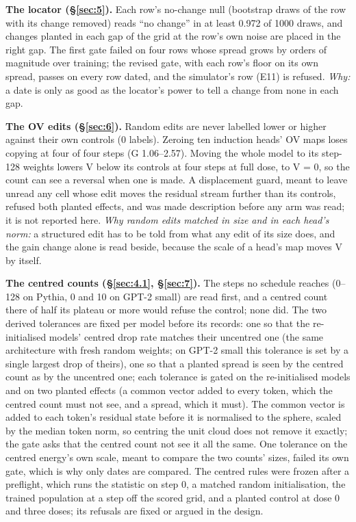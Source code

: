 \documentclass[11pt]{article}
\begin{document}
\textbf{The locator (\S\ref{sec:5}).} Each row's no-change null (bootstrap draws of the row with its change removed) reads ``no change'' in at least 0.972 of 1000 draws, and changes planted in each gap of the grid at the row's own noise are placed in the right gap. The first gate failed on four rows whose spread grows by orders of magnitude over training; the revised gate, with each row's floor on its own spread, passes on every row dated, and the simulator's row (E11) is refused. \emph{Why:} a date is only as good as the locator's power to tell a change from none in each gap.

\textbf{The OV edits (\S\ref{sec:6}).} Random edits are never labelled lower or higher against their own controls (0 labels). Zeroing ten induction heads' OV maps loses copying at four of four steps (G 1.06--2.57). Moving the whole model to its step-128 weights lowers V below its controls at four steps at full dose, to V = 0, so the count can see a reversal when one is made. A displacement guard, meant to leave unread any cell whose edit moves the residual stream further than its controls, refused both planted effects, and was made description before any arm was read; it is not reported here. \emph{Why random edits matched in size and in each head's norm:} a structured edit has to be told from what any edit of its size does, and the gain change alone is read beside, because the scale of a head's map moves V by itself.

\textbf{The centred counts (\S\ref{sec:4.1}, \S\ref{sec:7}).} The steps no schedule reaches (0--128 on Pythia, 0 and 10 on GPT-2 small) are read first, and a centred count there of half its plateau or more would refuse the control; none did. The two derived tolerances are fixed per model before its records: one so that the re-initialised models' centred drop rate matches their uncentred one (the same architecture with fresh random weights; on GPT-2 small this tolerance is set by a single largest drop of theirs), one so that a planted spread is seen by the centred count as by the uncentred one; each tolerance is gated on the re-initialised models and on two planted effects (a common vector added to every token, which the centred count must not see, and a spread, which it must). The common vector is added to each token's residual state before it is normalised to the sphere, scaled by the median token norm, so centring the unit cloud does not remove it exactly; the gate asks that the centred count not see it all the same. One tolerance on the centred energy's own scale, meant to compare the two counts' sizes, failed its own gate, which is why only dates are compared. The centred rules were frozen after a preflight, which runs the statistic on step 0, a matched random initialisation, the trained population at a step off the scored grid, and a planted control at dose 0 and three doses; its refusals are fixed or argued in the design.
\end{document}
